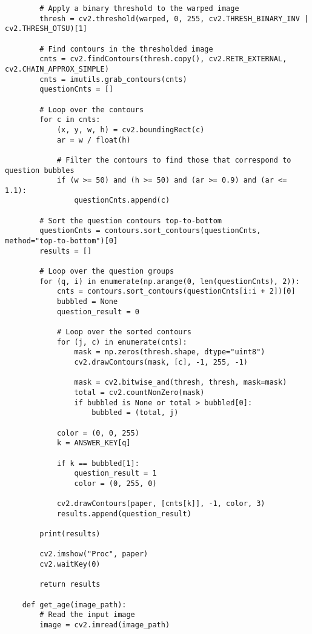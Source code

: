 \begin{lstlisting}
        # Apply a binary threshold to the warped image
        thresh = cv2.threshold(warped, 0, 255, cv2.THRESH_BINARY_INV | cv2.THRESH_OTSU)[1]
    
        # Find contours in the thresholded image
        cnts = cv2.findContours(thresh.copy(), cv2.RETR_EXTERNAL, cv2.CHAIN_APPROX_SIMPLE)
        cnts = imutils.grab_contours(cnts)
        questionCnts = []
    
        # Loop over the contours
        for c in cnts:
            (x, y, w, h) = cv2.boundingRect(c)
            ar = w / float(h)
            
            # Filter the contours to find those that correspond to question bubbles
            if (w >= 50) and (h >= 50) and (ar >= 0.9) and (ar <= 1.1):
                questionCnts.append(c)
    
        # Sort the question contours top-to-bottom
        questionCnts = contours.sort_contours(questionCnts, method="top-to-bottom")[0]
        results = []
    
        # Loop over the question groups
        for (q, i) in enumerate(np.arange(0, len(questionCnts), 2)):
            cnts = contours.sort_contours(questionCnts[i:i + 2])[0]
            bubbled = None
            question_result = 0
    
            # Loop over the sorted contours
            for (j, c) in enumerate(cnts):
                mask = np.zeros(thresh.shape, dtype="uint8")
                cv2.drawContours(mask, [c], -1, 255, -1)
    
                mask = cv2.bitwise_and(thresh, thresh, mask=mask)
                total = cv2.countNonZero(mask)
                if bubbled is None or total > bubbled[0]:
                    bubbled = (total, j)
    
            color = (0, 0, 255)
            k = ANSWER_KEY[q]
    
            if k == bubbled[1]:
                question_result = 1
                color = (0, 255, 0)
    
            cv2.drawContours(paper, [cnts[k]], -1, color, 3)
            results.append(question_result)
    
        print(results)
    
        cv2.imshow("Proc", paper)
        cv2.waitKey(0)
    
        return results
    
    def get_age(image_path):
        # Read the input image
        image = cv2.imread(image_path)
        

\end{lstlisting}
